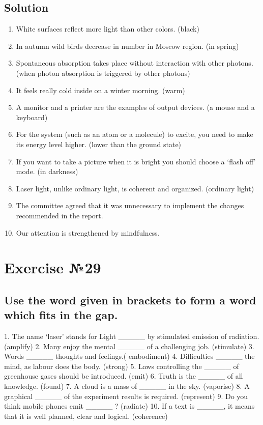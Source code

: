 \subsection*{Solution}
\begin{enumerate}
      \item White surfaces reflect more light than other colors. (black)
      \item In autumn wild birds decrease in number in Moscow region. (in spring)
      \item Spontaneous absorption takes place without interaction with other photons.
            (when photon absorption is triggered by other photons)
      \item It feels really cold inside on a winter morning. (warm)
      \item A monitor and a printer are the examples of output devices. (a mouse and
            a keyboard)
      \item For the system (such as an atom or a molecule) to excite, you need to make
            its energy level higher. (lower than the ground state)
      \item If you want to take a picture when it is bright you should choose a ‘flash
            off’ mode. (in darkness)
      \item Laser light, unlike ordinary light, is coherent and organized. (ordinary
            light)
      \item The committee agreed that it was unnecessary to implement the changes
            recommended in the report.
      \item Our attention is strengthened by mindfulness.
\end{enumerate}

\section*{Exercise №29}
\subsection*{Use the word given in brackets to form a word which fits in the gap.}
1. The name ‘laser’ stands for Light \_\_\_\_\_ by stimulated emission of radiation.
(amplify) 2. Many enjoy the mental \_\_\_\_\_ of a challenging job. (stimulate) 3.
Words \_\_\_\_\_ thoughts and feelings.( embodiment) 4. Difficulties \_\_\_\_\_ the
mind, as labour does the body. (strong) 5. Laws controlling the \_\_\_\_\_ of greenhouse
gases should be introduced. (emit) 6. Truth is the \_\_\_\_\_ of all knowledge. (found)
7. A cloud is a mass of \_\_\_\_\_ in the sky. (vaporise) 8. A graphical \_\_\_\_\_
of the experiment results is required. (represent) 9. Do you think mobile phones
emit \_\_\_\_\_ ? (radiate) 10. If a text is \_\_\_\_\_, it means that it is well
planned, clear and logical. (coherence)

